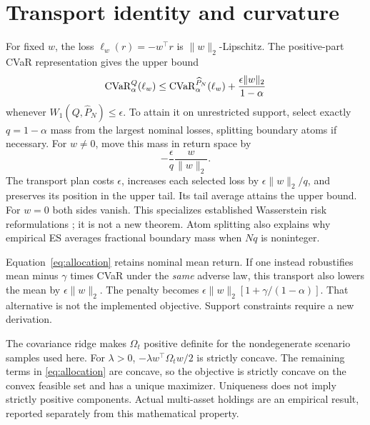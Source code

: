 \FloatBarrier
\appendix
\section{Transport identity and curvature}
\label{app:transport}
For fixed $w$, the loss $\ell_w(r)=-w^\top r$ is $\lVert w\rVert_2$-Lipschitz. The positive-part CVaR representation gives the upper bound
\begin{equation}
\operatorname{CVaR}^Q_\alpha(\ell_w)\leq
\operatorname{CVaR}^{\widehat P_N}_\alpha(\ell_w)+\frac{\epsilon\lVert w\rVert_2}{1-\alpha}
\end{equation}
whenever $W_1(Q,\widehat P_N)\leq\epsilon$. To attain it on unrestricted support, select exactly $q=1-\alpha$ mass from the largest nominal losses, splitting boundary atoms if necessary. For $w\ne0$, move this mass in return space by
\begin{equation}
-\frac{\epsilon}{q}\frac{w}{\lVert w\rVert_2}.
\end{equation}
The transport plan costs $\epsilon$, increases each selected loss by $\epsilon\lVert w\rVert_2/q$, and preserves its position in the upper tail. Its tail average attains the upper bound. For $w=0$ both sides vanish. This specializes established Wasserstein risk reformulations \cite{esfahani,kuhntutorial}; it is not a new theorem. Atom splitting also explains why empirical ES averages fractional boundary mass when $Nq$ is noninteger.

Equation~\eqref{eq:allocation} retains nominal mean return. If one instead robustifies mean minus $\gamma$ times CVaR under the \emph{same} adverse law, this transport also lowers the mean by $\epsilon\lVert w\rVert_2$. The penalty becomes $\epsilon\lVert w\rVert_2[1+\gamma/(1-\alpha)]$. That alternative is not the implemented objective. Support constraints require a new derivation.

The covariance ridge makes $\Omega_t$ positive definite for the nondegenerate scenario samples used here. For $\lambda>0$, $-\lambda w^\top\Omega_t w/2$ is strictly concave. The remaining terms in \eqref{eq:allocation} are concave, so the objective is strictly concave on the convex feasible set and has a unique maximizer. Uniqueness does not imply strictly positive components. Actual multi-asset holdings are an empirical result, reported separately from this mathematical property.

